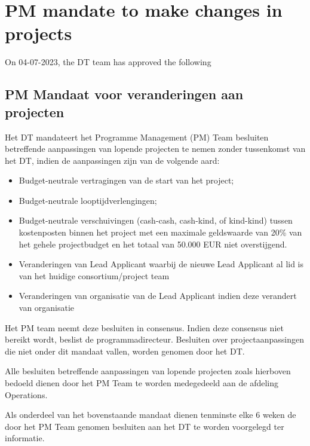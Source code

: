 \section{PM mandate to make changes in projects}
\label{app:pm-mandate}


On 04-07-2023, the DT team has approved the following 
\subsection*{PM Mandaat voor veranderingen aan projecten}
Het DT mandateert het Programme Management (PM) Team besluiten betreffende
aanpassingen van lopende projecten te nemen zonder tussenkomst van het DT, indien de aanpassingen zijn van de volgende
aard:
\begin{itemize}
\item Budget-neutrale vertragingen van de start van het project;
\item Budget-neutrale looptijdverlengingen;
\item Budget-neutrale verschuivingen (cash-cash, cash-kind, of kind-kind) tussen kostenposten binnen het project met een maximale
geldswaarde van 20\% van het gehele projectbudget en het totaal van 50.000 EUR niet overstijgend.
\item Veranderingen van Lead Applicant waarbij de nieuwe Lead Applicant al lid is
van het huidige consortium/project team
\item Veranderingen van organisatie van de Lead Applicant indien deze verandert van organisatie
\end{itemize}

Het PM team neemt deze besluiten in consensus. Indien deze consensus niet
bereikt wordt, beslist de programmadirecteur. Besluiten over projectaanpassingen die niet onder dit mandaat vallen,
worden genomen door het DT.

Alle besluiten betreffende aanpassingen van lopende projecten zoals hierboven
bedoeld dienen door het PM Team te worden medegedeeld aan de afdeling Operations.

Als onderdeel van het bovenstaande mandaat dienen tenminste elke 6 weken de
door het PM Team genomen besluiten aan het DT te worden voorgelegd ter informatie.
